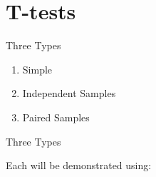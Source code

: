 \section{T-tests}\label{t-tests}

\begin{frame}{Three Types}

\Huge

\begin{enumerate}
\item Simple
\item Independent Samples
\item Paired Samples
\end{enumerate}

\end{frame}

\begin{frame}[fragile]{Three Types}

\Large
Each will be demonstrated using:

\normalsize

\begin{Shaded}
\begin{Highlighting}[]
\StringTok{ }\NormalTok{(}\NormalTok{=}\NormalTok{(}\NormalTok{(}\NormalTok{,}\NormalTok{), }\NormalTok{, } \NormalTok{),}
                 \NormalTok{=}\NormalTok{(}\NormalTok{),}
                 \NormalTok{=}\NormalTok{(}\NormalTok{))}
\end{Highlighting}
\end{Shaded}


\end{frame}
